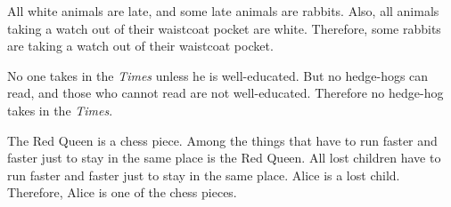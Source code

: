 \begin{exercises}



\item All white animals are late, and some late animals are rabbits. Also, all animals taking a watch out of their waistcoat pocket are white. Therefore, some rabbits are taking a watch out of their waistcoat pocket.







\item \label{itm:hedgehogs} No one takes in the \textit{Times} unless he is well-educated. But no hedge-hogs can read, and those who cannot read are not well-educated. Therefore no hedge-hog takes in the \textit{Times}.

\item The Red Queen is a chess piece. Among the things that have to run faster and faster just to stay in the same place is the Red Queen. All lost children have to run faster and faster just to stay in the same place. Alice is a lost child. Therefore, Alice is one of the chess pieces.


\end{exercises}
